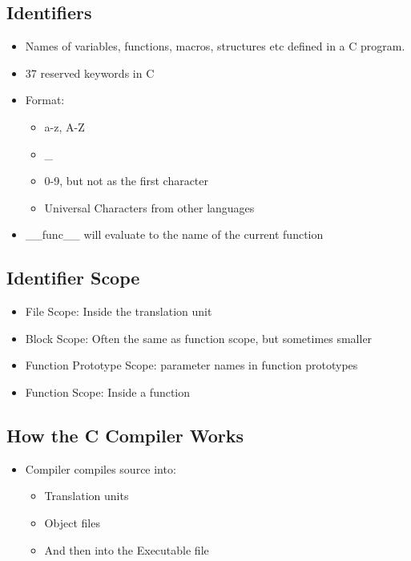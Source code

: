 \documentclass[a4wide,10pt]{article}
\begin{document}
		\subsection{Identifiers} %
		\label{sub:identifiers}
			\begin{itemize}
				\item Names of variables, functions, macros, structures etc defined in a C program.
				\item 37 reserved keywords in C
				\item Format:
					\begin{itemize}
						\item a-z, A-Z
						\item \_
						\item 0-9, but not as the first character
						\item Universal Characters from other languages
					\end{itemize}
				\item \_\_func\_\_ will evaluate to the name of the current function
			\end{itemize}
		
		\subsection{Identifier Scope} %
		\label{sub:identifier_scope}
			\begin{itemize}
				\item File Scope: Inside the translation unit
				\item Block Scope: Often the same as function scope, but sometimes smaller
				\item Function Prototype Scope: parameter names in function prototypes
				\item Function Scope: Inside a function
			\end{itemize}
		
		\subsection{How the C Compiler Works} %
		\label{sub:how_the_c_compiler_works}
			\begin{itemize}
				\item Compiler compiles source into:
					\begin{itemize}
						\item Translation units
						\item Object files
						\item And then into the Executable file
					\end{itemize}
			\end{itemize}
	
\end{document}
